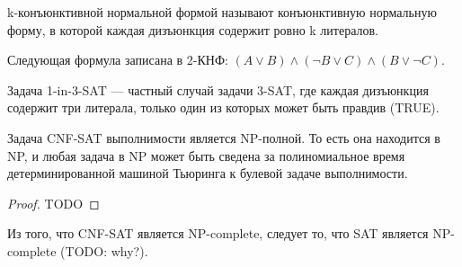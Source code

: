     \begin{Def}[k-КНФ]
        k-конъюнктивной нормальной формой называют конъюнктивную нормальную форму, в которой каждая дизъюнкция содержит ровно k литералов.
    \end{Def}
    \begin{Example}
        Следующая формула записана в 2-КНФ:
        $(A\lor B)\land (\neg B\lor C)\land (B\lor \neg C)$.
    \end{Example}
    \begin{Def}
        Задача 1-in-3-SAT --- частный случай задачи 3-SAT, где каждая дизъюнкция содержит три литерала, только один из которых может быть правдив (TRUE).
    \end{Def}
    \begin{Thm}
        Задача CNF-SAT выполнимости является NP-полной. То есть она находится в NP, и любая задача в NP может быть сведена за полиномиальное время детерминированной машиной Тьюринга к булевой задаче выполнимости.
    \end{Thm}
    \begin{proof}
        TODO
    \end{proof}
    \begin{Rem}
        Из того, что CNF-SAT является NP-complete, следует то, что SAT является NP-complete (TODO: why?).
    \end{Rem}

    
